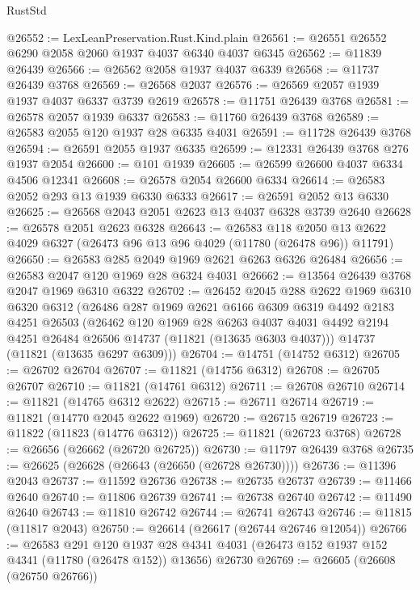 \begin{lexlean}{RustStd}
\begin{coremodule}
@26552 := LexLeanPreservation.Rust.Kind.plain
@26561 := @26551 @26552 @6290 @2058 @2060 @1937 @4037 @6340 @4037 @6345
@26562 := @11839 @26439
@26566 := @26562 @2058 @1937 @4037 @6339
@26568 := @11737 @26439 @3768
@26569 := @26568 @2037
@26576 := @26569 @2057 @1939 @1937 @4037 @6337 @3739 @2619
@26578 := @11751 @26439 @3768
@26581 := @26578 @2057 @1939 @6337
@26583 := @11760 @26439 @3768
@26589 := @26583 @2055 @120 @1937 @28 @6335 @4031
@26591 := @11728 @26439 @3768
@26594 := @26591 @2055 @1937 @6335
@26599 := @12331 @26439 @3768 @276 @1937 @2054
@26600 := @101 @1939
@26605 := @26599 @26600 @4037 @6334 @4506 @12341
@26608 := @26578 @2054 @26600 @6334
@26614 := @26583 @2052 @293 @13 @1939 @6330 @6333
@26617 := @26591 @2052 @13 @6330
@26625 := @26568 @2043 @2051 @2623 @13 @4037 @6328 @3739 @2640
@26628 := @26578 @2051 @2623 @6328
@26643 := @26583
    @118
    @2050
    @13
    @2622
    @4029
    @6327
    (@26473 @96 @13 @96 @4029 (@11780 (@26478 @96)) @11791)
@26650 := @26583 @285 @2049 @1969 @2621 @6263 @6326 @26484
@26656 := @26583 @2047 @120 @1969 @28 @6324 @4031
@26662 := @13564 @26439 @3768 @2047 @1969 @6310 @6322
@26702 := @26452
    @2045
    @288
    @2622
    @1969
    @6310
    @6320
    @6312
    (@26486
      @287
      @1969
      @2621
      @6166
      @6309
      @6319
      @4492
      @2183
      @4251
      @26503
      (@26462
        @120
        @1969
        @28
        @6263
        @4037
        @4031
        @4492
        @2194
        @4251
        @26484
        @26506
        @14737
        (@11821 (@13635 @6303 @4037)))
      @14737
      (@11821 (@13635 @6297 @6309)))
@26704 := @14751 (@14752 @6312)
@26705 := @26702 @26704
@26707 := @11821 (@14756 @6312)
@26708 := @26705 @26707
@26710 := @11821 (@14761 @6312)
@26711 := @26708 @26710
@26714 := @11821 (@14765 @6312 @2622)
@26715 := @26711 @26714
@26719 := @11821 (@14770 @2045 @2622 @1969)
@26720 := @26715 @26719
@26723 := @11822 (@11823 (@14776 @6312))
@26725 := @11821 (@26723 @3768)
@26728 := @26656 (@26662 (@26720 @26725))
@26730 := @11797 @26439 @3768
@26735 := @26625 (@26628 (@26643 (@26650 (@26728 @26730))))
@26736 := @11396 @2043
@26737 := @11592 @26736
@26738 := @26735 @26737
@26739 := @11466 @2640
@26740 := @11806 @26739
@26741 := @26738 @26740
@26742 := @11490 @2640
@26743 := @11810 @26742
@26744 := @26741 @26743
@26746 := @11815 (@11817 @2043)
@26750 := @26614 (@26617 (@26744 @26746 @12054))
@26766 := @26583
    @291
    @120
    @1937
    @28
    @4341
    @4031
    (@26473 @152 @1937 @152 @4341 (@11780 (@26478 @152)) @13656)
    @26730
@26769 := @26605 (@26608 (@26750 @26766))

\end{coremodule}
\end{lexlean}
